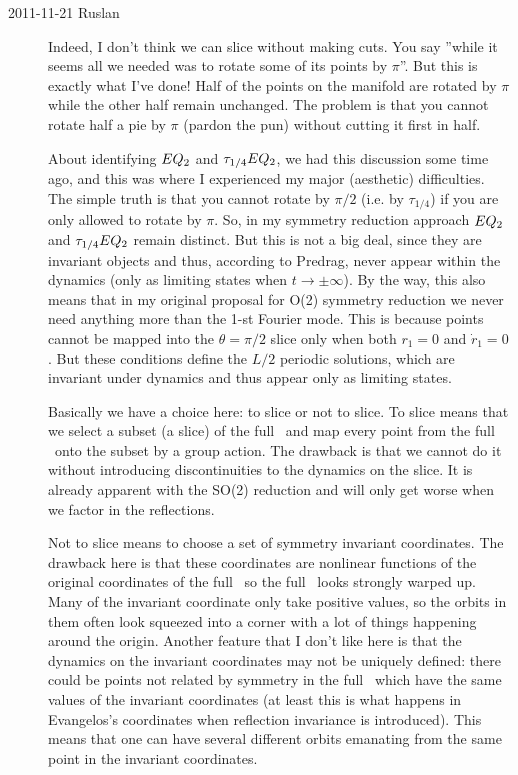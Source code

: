 \begin{description}
\item[2011-11-21 Ruslan] Indeed, I don't think we can slice without making cuts.  You say ''while it seems all we needed was to rotate some of its points by $\pi$''.  But this is exactly what I've done!  Half of the points on the manifold are rotated by $\pi$ while the other half remain unchanged.  The problem is that you cannot rotate half a pie by $\pi$ (pardon the pun) without cutting it first in half.

    About identifying $EQ_{2}$ and $\tau_{1/4}EQ_{2}$, we had this discussion some time ago, and this was where I experienced my major (aesthetic) difficulties.  The simple truth is that you cannot rotate by $\pi/2$ (i.e. by $\tau_{1/4}$) if you are only allowed to rotate by $\pi$.  So, in my symmetry reduction approach $EQ_{2}$ and $\tau_{1/4}EQ_{2}$ remain distinct.  But this is not a big deal, since they are invariant objects and thus, according to Predrag, never appear within the dynamics (only as limiting states when $t \to \pm \infty$).
    By the way, this also means that in my original proposal for O(2) symmetry reduction we never need anything more than the 1-st Fourier mode.  This is because points cannot be mapped into the $\theta = \pi/2$ slice only when both $r_1 = 0$ and $\dot{r}_1 = 0$.  But these conditions define the $L/2$ periodic solutions, which are invariant under \KS dynamics and thus appear only as limiting states.

    Basically we have a choice here: to slice or not to slice.  To slice means that we select a subset (a slice) of the full \statesp\ and map every point from the full \statesp\ onto the subset by a group action.  The drawback is that we cannot do it without introducing discontinuities to the dynamics on the slice.  It is already apparent with the SO(2) reduction and will only get worse when we factor in the reflections.

    Not to slice means to choose a set of symmetry invariant coordinates.  The drawback here is that these coordinates are nonlinear functions of the original coordinates of the full \statesp\, so the full \statesp\ looks strongly warped up.  Many of the invariant coordinate only take positive values, so the orbits in them often look squeezed into a corner with a lot of things happening around the origin.  Another feature that I don't like here is that the dynamics on the invariant coordinates may not be uniquely defined: there could be points not related by symmetry in the full \statesp\ which have the same values of the invariant coordinates (at least this is what happens in Evangelos's coordinates when reflection invariance is introduced).  This means that one can have several different orbits emanating from the same point in the invariant coordinates.


\end{description}
